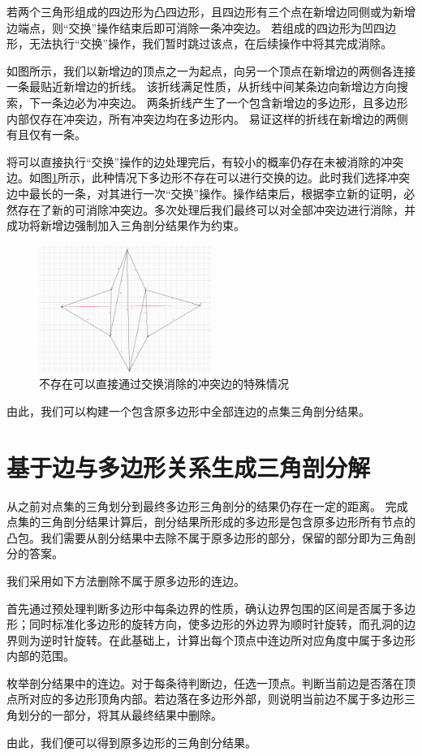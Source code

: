 若两个三角形组成的四边形为凸四边形，且四边形有三个点在新增边同侧或为新增边端点，则“交换”操作结束后即可消除一条冲突边。
若组成的四边形为凹四边形，无法执行“交换”操作，我们暂时跳过该点，在后续操作中将其完成消除。

如图所示，我们以新增边的顶点之一为起点，向另一个顶点在新增边的两侧各连接一条最贴近新增边的折线。
该折线满足性质，从折线中间某条边向新增边方向搜索，下一条边必为冲突边。
两条折线产生了一个包含新增边的多边形，且多边形内部仅存在冲突边，所有冲突边均在多边形内。
易证这样的折线在新增边的两侧有且仅有一条。

将可以直接执行“交换”操作的边处理完后，有较小的概率仍存在未被消除的冲突边。如图\ref*{deadlock}所示，此种情况下多边形不存在可以进行交换的边。此时我们选择冲突边中最长的一条，对其进行一次“交换”操作。操作结束后，根据李立新的证明，必然存在了新的可消除冲突边。多次处理后我们最终可以对全部冲突边进行消除，并成功将新增边强制加入三角剖分结果作为约束。

\begin{figure}[htp]
    \centering
    \includegraphics[width=0.5\textwidth]
    {figures/deadlock.png}
    \caption{不存在可以直接通过交换消除的冲突边的特殊情况}
    \label{deadlock}
  \end{figure}

由此，我们可以构建一个包含原多边形中全部连边的点集三角剖分结果。

\section{基于边与多边形关系生成三角剖分解}

从之前对点集的三角划分到最终多边形三角剖分的结果仍存在一定的距离。
完成点集的三角剖分结果计算后，剖分结果所形成的多边形是包含原多边形所有节点的凸包。我们需要从剖分结果中去除不属于原多边形的部分，保留的部分即为三角剖分的答案。

我们采用如下方法删除不属于原多边形的连边。

首先通过预处理判断多边形中每条边界的性质，确认边界包围的区间是否属于多边形；同时标准化多边形的旋转方向，使多边形的外边界为顺时针旋转，而孔洞的边界则为逆时针旋转。在此基础上，计算出每个顶点中连边所对应角度中属于多边形内部的范围。

枚举剖分结果中的连边。对于每条待判断边，任选一顶点。判断当前边是否落在顶点所对应的多边形顶角内部。若边落在多边形外部，则说明当前边不属于多边形三角划分的一部分，将其从最终结果中删除。

由此，我们便可以得到原多边形的三角剖分结果。